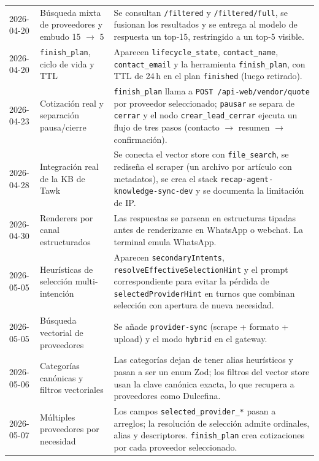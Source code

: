 \documentclass[11pt,a4paper]{article}
\begin{document}
\begin{longtable}{p{2.4cm}p{4.0cm}p{9.0cm}}
2026-04-20 & Búsqueda mixta de proveedores y embudo 15 $\to$ 5 &
Se consultan \texttt{/filtered} y \texttt{/filtered/full}, se
fusionan los resultados y se entrega al modelo de respuesta un
top-15, restringido a un top-5 visible. \\

2026-04-20 & \texttt{finish\_plan}, ciclo de vida y TTL &
Aparecen \texttt{lifecycle\_state}, \texttt{contact\_name},
\texttt{contact\_email} y la herramienta
\texttt{finish\_plan}, con TTL de 24\,h en el plan
\texttt{finished} (luego retirado). \\

2026-04-23 & Cotización real y separación pausa/cierre &
\texttt{finish\_plan} llama a
\texttt{POST /api-web/vendor/quote} por proveedor seleccionado;
\texttt{pausar} se separa de \texttt{cerrar} y el nodo
\texttt{crear\_lead\_cerrar} ejecuta un flujo de tres pasos
(contacto $\to$ resumen $\to$ confirmación). \\

2026-04-28 & Integración real de la KB de Tawk &
Se conecta el vector store con \texttt{file\_search}, se rediseña
el scraper (un archivo por artículo con metadatos), se crea el
stack \texttt{recap-agent-knowledge-sync-dev} y se documenta la
limitación de IP. \\

2026-04-30 & Renderers por canal estructurados &
Las respuestas se parsean en estructuras tipadas antes de
renderizarse en WhatsApp o webchat. La terminal emula WhatsApp. \\

2026-05-05 & Heurísticas de selección multi-intención &
Aparecen \texttt{secondaryIntents},
\texttt{resolveEffectiveSelectionHint} y el prompt
correspondiente para evitar la pérdida de
\texttt{selectedProviderHint} en turnos que combinan selección con
apertura de nueva necesidad. \\

2026-05-05 & Búsqueda vectorial de proveedores &
Se añade \texttt{provider-sync} (scrape + formato + upload) y el
modo \texttt{hybrid} en el gateway. \\

2026-05-06 & Categorías canónicas y filtros vectoriales &
Las categorías dejan de tener alias heurísticos y pasan a ser un
enum Zod; los filtros del vector store usan la clave canónica
exacta, lo que recupera a proveedores como Dulcefina. \\

2026-05-07 & Múltiples proveedores por necesidad &
Los campos \texttt{selected\_provider\_*} pasan a arreglos; la
resolución de selección admite ordinales, alias y descriptores.
\texttt{finish\_plan} crea cotizaciones por cada proveedor
seleccionado. \\


\end{longtable}
\end{document}
